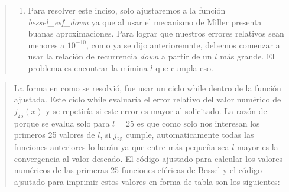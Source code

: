 \documentclass[9pt]{article}
\providecommand{\tightlist}{%
      \setlength{\itemsep}{0pt}\setlength{\parskip}{0pt}}
\begin{document}
    \begin{quote}
\begin{enumerate}
\def\labelenumi{(\alph{enumi})}
\setcounter{enumi}{1}
\tightlist
\item
  Para resolver este inciso, solo ajustaremos a la función
  \emph{bessel\_esf\_down} ya que al usar el mecanismo de Miller
  presenta buanas aproximaciones. Para lograr que nuestros errores
  relativos sean menores a \(10^{-10}\), como ya se dijo anterioremnte,
  debemos comenzar a usar la relación de recurrencia \emph{down} a
  partir de un \(l\) más grande. El problema es encontrar la mímina
  \(l\) que cumpla eso.
\end{enumerate}
\end{quote}

\begin{quote}
La forma en como se resolvió, fue usar un ciclo while dentro de la
función ajustada. Este ciclo while evaluaría el error relativo del valor
numérico de \(j_{25}(x)\) y se repetiría si este error es mayor al
solicitado. La razón de porque se evalua solo para \(l=25\) es que como
solo nos interesan los primeros 25 valores de \(l\), si \(j_{25}\)
cumple, automaticamente todas las funciones anteriores lo harán ya que
entre más pequeña sea \(l\) mayor es la convergencia al valor deseado.
El código ajustado para calcular los valores numéricos de las primeras
25 funciones eféricas de Bessel y el código ajsutado para imprimir estos
valores en forma de tabla son los siguientes:
\end{quote}
\end{document}

